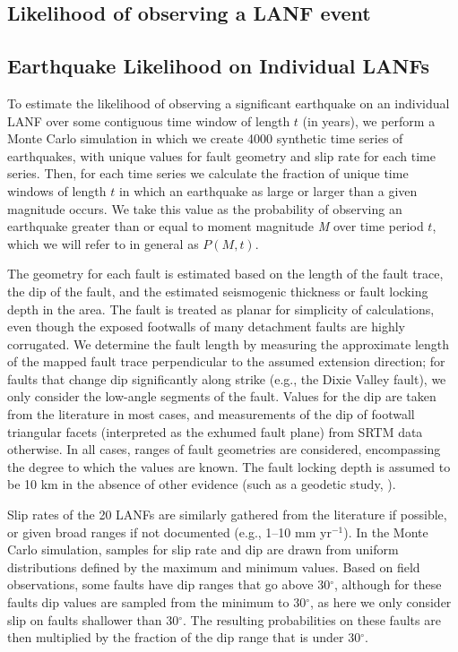 \documentclass[twocolumn,grl]{AGUTeX}
\begin{document}
\begin{article}
\section{Likelihood of observing a LANF event}
\subsection{Earthquake Likelihood on Individual LANFs}
To estimate the likelihood of observing a significant earthquake on an
individual LANF over some contiguous time window of length $t$ (in
years), we perform a Monte Carlo simulation in which we create 4000
synthetic time series of earthquakes, with unique values for fault
geometry and slip rate for each time series. Then, for each time
series we calculate the fraction of unique time windows of length $t$
in which an earthquake as large or larger than a given magnitude
occurs.  We take this value as the probability of observing an
earthquake greater than or equal to moment magnitude \emph{M} over
time period $t$, which we will refer to in general as $P(M,t)$.

The geometry for each fault is estimated based on the length of the
fault trace, the dip of the fault, and the estimated seismogenic
thickness or fault locking depth in the area.  The fault is treated as
planar for simplicity of calculations, even though the exposed
footwalls of many detachment faults are highly corrugated.  We
determine the fault length by measuring the approximate length of the
mapped fault trace perpendicular to the assumed extension direction;
for faults that change dip significantly along strike (e.g., the Dixie
Valley fault), we only consider the low-angle segments of the fault.
Values for the dip are taken from the literature in most cases, and
measurements of the dip of footwall triangular facets (interpreted as the exhumed
fault plane) from SRTM data otherwise. In all cases, ranges of fault
geometries are considered, encompassing the degree to which the values are 
known. The fault locking depth is assumed to be 10 km in the absence of other
evidence (such as a geodetic study, \citep[e.g.,][]{hreinsdottir2009altotib}).

Slip rates of the 20 LANFs are similarly gathered from the
literature if possible, or given broad ranges if not documented
(e.g., 1--10 mm yr$^{-1}$).  In the Monte Carlo simulation, samples
for slip rate and dip are drawn from uniform distributions defined
by the maximum and minimum values.  Based on field observations,
some faults have dip ranges that go above 30$^\circ$, although for these faults dip values are sampled from the minimum to 30$^\circ$, as here we
only consider slip on faults shallower than 30$^\circ$. The resulting probabilities on these faults are then multiplied by the fraction of
the dip range that is under 30$^\circ$.


\end{article}
\end{document}
